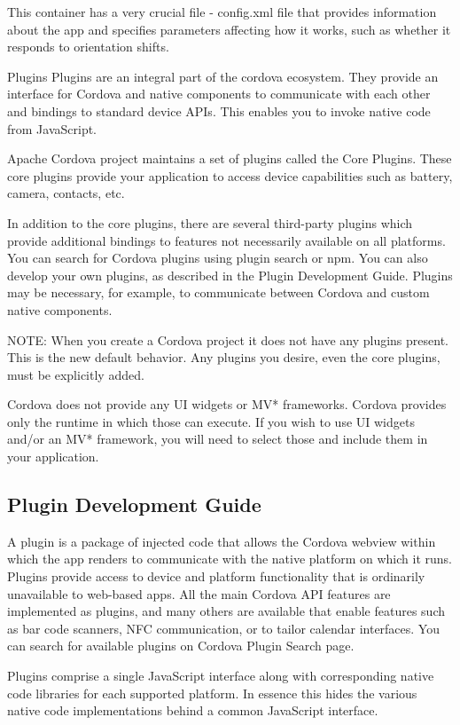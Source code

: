 This container has a very crucial file - config.xml file that provides information about the app and specifies parameters affecting how it works, such as whether it responds to orientation shifts.

Plugins
Plugins are an integral part of the cordova ecosystem. They provide an interface for Cordova and native components to communicate with each other and bindings to standard device APIs. This enables you to invoke native code from JavaScript.

Apache Cordova project maintains a set of plugins called the Core Plugins. These core plugins provide your application to access device capabilities such as battery, camera, contacts, etc.

In addition to the core plugins, there are several third-party plugins which provide additional bindings to features not necessarily available on all platforms. You can search for Cordova plugins using plugin search or npm. You can also develop your own plugins, as described in the Plugin Development Guide. Plugins may be necessary, for example, to communicate between Cordova and custom native components.

NOTE: When you create a Cordova project it does not have any plugins present. This is the new default behavior. Any plugins you desire, even the core plugins, must be explicitly added.

Cordova does not provide any UI widgets or MV* frameworks. Cordova provides only the runtime in which those can execute. If you wish to use UI widgets and/or an MV* framework, you will need to select those and include them in your application.

\subsection{Plugin Development Guide}
A plugin is a package of injected code that allows the Cordova webview within which the app renders to communicate with the native platform on which it runs. Plugins provide access to device and platform functionality that is ordinarily unavailable to web-based apps. All the main Cordova API features are implemented as plugins, and many others are available that enable features such as bar code scanners, NFC communication, or to tailor calendar interfaces. You can search for available plugins on Cordova Plugin Search page.

Plugins comprise a single JavaScript interface along with corresponding native code libraries for each supported platform. In essence this hides the various native code implementations behind a common JavaScript interface.

